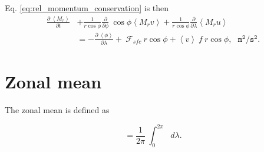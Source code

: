 \documentclass[11pt]{article}
\numberwithin{equation}{section}
\newcommand{\beq}{\begin{equation}}
\newcommand{\eeq}{\end{equation}}
\newcommand{\la}{\langle}
\newcommand{\ra}{\rangle}
\newcommand{\vect}[1]{\boldsymbol{#1}}
\newcommand{\Dt}[1]{\frac{D#1}{D t}}
\newcommand{\lara}[1]{\left\la{#1}\right\ra}
\newcommand{\cphi}{\cos \phi}
\begin{document}
Eq. \eqref{eq:rel_momentum_conservation} is then 
\begin{align} \label{eq:vert_int}
\frac{\partial ~\lara{M_r}}{\partial t}  &+ \frac{1}{r \cos{\phi}}  \frac{\partial}{\partial \phi}  ~\cos{\phi} \lara{ M_r v } + \frac{1}{r \cos{\phi}} \frac{\partial}{\partial \lambda} \lara{M_r u} \nonumber \\ 
&=   - \frac{\partial~\lara{\phi}}{\partial \lambda} + ~ \mathcal{F}_{sfc}~ r \cphi + \lara{v} ~ f ~r \cphi,    ~~~\mathtt{m^2 /s^2}.  
\end{align}

%

\section{Zonal mean}
The zonal mean is defined as 

\beq
[~\cdot~] =  \frac{1}{2 \pi} ~ \int_0^ {2 \pi} ~~~ d\lambda.
\eeq

\end{document}
